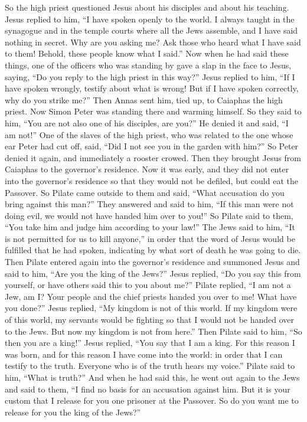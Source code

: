 \begin{biblechapter}
 So the high priest questioned Jesus about his disciples and about his teaching.
\verse Jesus replied to him, “I have spoken openly to the world. I always taught in the synagogue and in the temple courts where all the Jews assemble, and I have said nothing in secret.
\verse Why are you asking me? Ask those who heard what I have said to them! Behold, these people know what I said.”
\verse Now when he had said these things, one of the officers who was standing by gave a slap in the face to Jesus, saying, “Do you reply to the high priest in this way?”
\verse Jesus replied to him, “If I have spoken wrongly, testify about what is wrong! But if I have spoken correctly, why do you strike me?”
\verse Then Annas sent him, tied up, to Caiaphas the high priest.
 Now Simon Peter was standing there and warming himself. So they said to him, “You are not also one of his disciples, are you?” He denied it and said, “I am not!”
\verse One of the slaves of the high priest, who was related to the one whose ear Peter had cut off, said, “Did I not see you in the garden with him?”
\verse So Peter denied it again, and immediately a rooster crowed.
 Then they brought Jesus from Caiaphas to the governor’s residence. Now it was early, and they did not enter into the governor’s residence so that they would not be defiled, but could eat the Passover.
\verse So Pilate came outside to them and said, “What accusation do you bring against this man?”
\verse They answered and said to him, “If this man were not doing evil, we would not have handed him over to you!”
\verse So Pilate said to them, “You take him and judge him according to your law!” The Jews said to him, “It is not permitted for us to kill anyone,”
\verse in order that the word of Jesus would be fulfilled that he had spoken, indicating by what sort of death he was going to die.
 Then Pilate entered again into the governor’s residence and summoned Jesus and said to him, “Are you the king of the Jews?”
\verse Jesus replied, “Do you say this from yourself, or have others said this to you about me?”
\verse Pilate replied, “I am not a Jew, am I? Your people and the chief priests handed you over to me! What have you done?”
\verse Jesus replied, “My kingdom is not of this world. If my kingdom were of this world, my servants would be fighting so that I would not be handed over to the Jews. But now my kingdom is not from here.”
\verse Then Pilate said to him, “So then you are a king!” Jesus replied, “You say that I am a king. For this reason I was born, and for this reason I have come into the world: in order that I can testify to the truth. Everyone who is of the truth hears my voice.”
\verse Pilate said to him, “What is truth?”
\verse And when he had said this, he went out again to the Jews and said to them, “I find no basis for an accusation against him.
\verse But it is your custom that I release for you one prisoner at the Passover. So do you want me to release for you the king of the Jews?”
\end{biblechapter}

